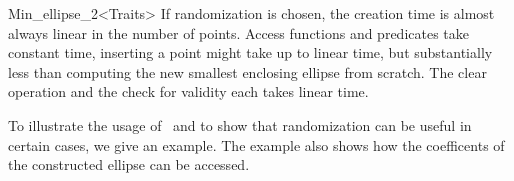 \begin{ccRefClass}{Min_ellipse_2<Traits>}
If randomization is
chosen, the creation time is almost always linear in the number of points.
Access functions and predicates take constant time, inserting a point might
take up to linear time, but substantially less than computing the new
smallest enclosing ellipse from scratch. The clear operation and the check
for validity each takes linear time.

\ccExample
{}

To illustrate the usage of \ccRefName\ and to show that randomization
can be useful in certain cases, we give an example. The example also
shows how the coefficents of the constructed ellipse can be accessed. 



\ccRestoreThreeColumns

\end{ccRefClass}


